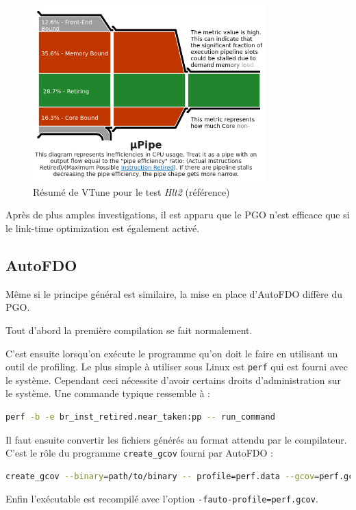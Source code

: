 \documentclass[a4paper,11pt]{report}
\begin{document}
\begin{figure}[H]
    \includegraphics[width=0.8\textwidth, center]{hlt2_vtune_pipe.png}
    \caption{Résumé de VTune pour le test \emph{Hlt2} (référence)}
    \label{hlt2_vtune_pipe}
\end{figure}

Après de plus amples investigations, il est apparu que le PGO n'est efficace que si le link-time optimization est également activé.

\subsection{AutoFDO}
Même si le principe général est similaire, la mise en place d'AutoFDO diffère du PGO.

Tout d'abord la première compilation se fait normalement.

C'est ensuite lorsqu'on exécute le programme qu'on doit le faire en utilisant un outil de profiling.
Le plus simple à utiliser sous Linux est \verb'perf' qui est fourni avec le système.
Cependant ceci nécessite d'avoir certains droits d'administration sur le système.
Une commande typique ressemble à :
\begin{lstlisting}[language=bash]
perf -b -e br_inst_retired.near_taken:pp -- run_command
\end{lstlisting}
Il faut ensuite convertir les fichiers générés au format attendu par le compilateur.
C'est le rôle du programme \verb'create_gcov' fourni par AutoFDO :
\begin{lstlisting}[language=bash]
create_gcov --binary=path/to/binary -- profile=perf.data --gcov=perf.gcov -gcov_version=1
\end{lstlisting}

Enfin l'exécutable est recompilé avec l'option \verb'-fauto-profile=perf.gcov'.
\end{document}
